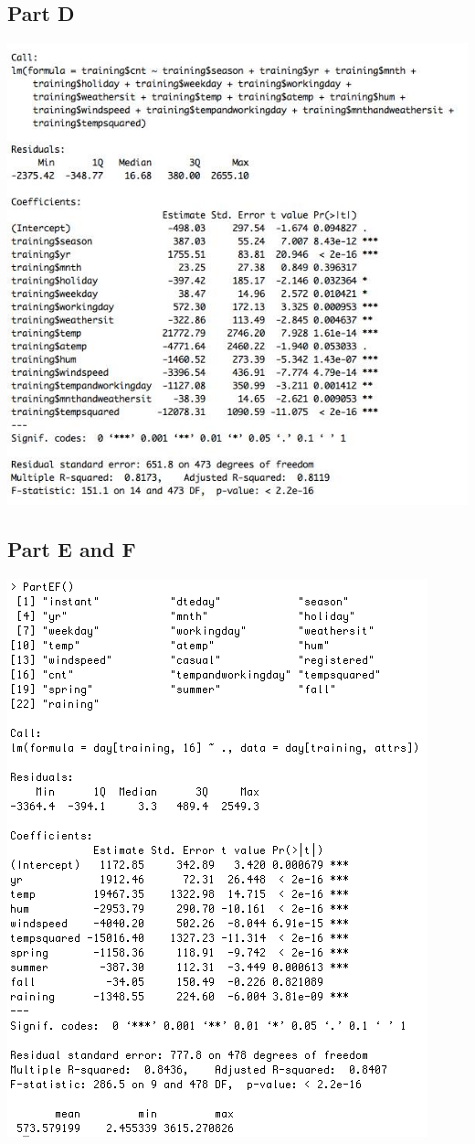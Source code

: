 \documentclass[11pt]{article}
\begin{document}
\subsection{Part D}
\label{subsec:problem2doutput}
\includegraphics[totalheight=0.65\textheight]{Part2Doutput.jpg}
\pagebreak
\subsection{Part E and F}
\label{subsec:problem2efoutput}
\includegraphics[totalheight=0.65\textheight]{Output2PartEF.jpg}
\pagebreak
\end{document}
